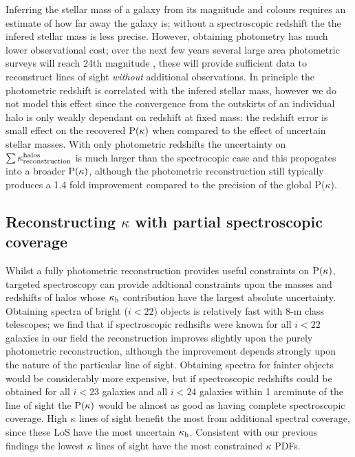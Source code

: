 \documentclass[useAMS,usenatbib]{mn2e}
\begin{document}
Inferring the stellar mass of a galaxy from its magnitude and colours requires an estimate of how far away the galaxy is; without a spectroscopic redshift the the infered stellar mass is less precise. However, obtaining photometry has much lower observational cost; over the next few years several large area photometric surveys will reach 24th magnitude \citep{DES,EUCLID,LSST}, these will provide sufficient data to reconstruct lines of sight {\it without} additional observations. In principle the photometric redshift is correlated with the infered stellar mass, however we do not model this effect since the convergence from the outskirts of an individual halo is only weakly dependant on redshift at fixed mass: the redshift error is small effect on the recovered ${\rm P}(\kappa)$ when compared to the effect of uncertain stellar masses.  With only photometric redshifts the uncertainty on $\sum\kappa_{\rm reconstruction}^{\rm halos}$ is much larger than the spectrocopic case and this propogates into a broader ${\rm P}(\kappa)$, although the photometric reconstruction still typically produces a 1.4 fold improvement compared to the precision of the global P($\kappa$).

\subsection{Reconstructing $\kappa$ with partial spectroscopic coverage}

Whilst a fully photometric reconstruction provides useful constraints on ${\rm P}(\kappa)$, targeted spectroscopy can provide addtional constraints upon the masses and redshifts of halos whose $\kappa_{\rm h}$ contribution have the largest absolute uncertainty. Obtaining spectra of bright ($i<22$) objects is relatively fast with 8-m class telescopes; we find that if spectroscopic redhsifts were known for all $i<22$ galaxies in our field the reconstruction improves slightly upon the purely photometric reconstruction, although the improvement depends strongly upon the nature of the particular line of sight. Obtaining spectra for fainter objects would be considerably more expensive, but if spectroscopic redshifts could be obtained for all $i<23$ galaxies and all $i<24$ galaxies within 1 arcminute of the line of sight the ${\rm P}(\kappa)$ would be almost as good as having complete spectroscopic coverage. High $\kappa$ lines of sight benefit the most from additional spectral coverage, since these LoS have the most uncertain $\kappa_{\rm h}$. Consistent with our previous findings the lowest $\kappa$ lines of sight have the most constrained $\kappa$ PDFs.
\end{document}

